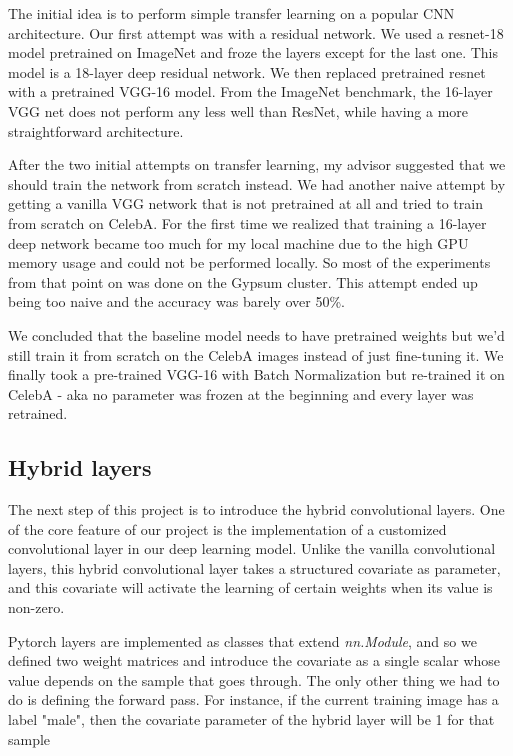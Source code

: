 \documentclass[12pt]{article}
\begin{document}
The initial idea is to perform simple transfer learning on a popular CNN architecture. Our first attempt was with a residual network. We used a resnet-18 model pretrained on ImageNet and froze the layers except for the last one. This model is a 18-layer deep residual network. We then replaced pretrained resnet with a pretrained VGG-16 model. From the ImageNet benchmark, the 16-layer VGG net does not perform any less well than ResNet, while having a more straightforward architecture. 

After the two initial attempts on transfer learning, my advisor suggested that we should train the network from scratch instead. We had another naive attempt by getting a vanilla VGG network that is not pretrained at all and tried to train from scratch on CelebA. For the first time we realized that training a 16-layer deep network became too much for my local machine due to the high GPU memory usage and could not be performed locally. So most of the experiments from that point on was done on the Gypsum cluster. This attempt ended up being too naive and the accuracy was barely over 50\%.

We concluded that the baseline model needs to have pretrained weights but we'd still train it from scratch on the CelebA images instead of just fine-tuning it. We finally took a pre-trained VGG-16 with Batch Normalization but re-trained it on CelebA - aka no parameter was frozen at the beginning and every layer was retrained. 

\subsection{Hybrid layers}
The next step of this project is to introduce the hybrid convolutional layers. One of the core feature of our project is the implementation of a customized convolutional layer in our deep learning model. Unlike the vanilla convolutional layers, this hybrid convolutional layer takes a structured covariate as parameter, and this covariate will activate the learning of certain weights when its value is non-zero.

Pytorch layers are implemented as classes that extend \textit{nn.Module}, and so we defined two weight matrices and introduce the covariate as a single scalar whose value depends on the sample that goes through. The only other thing we had to do is defining the forward pass. For instance, if the current training image has a label "male", then the covariate parameter of the hybrid layer will be 1 for that sample
\end{document}
